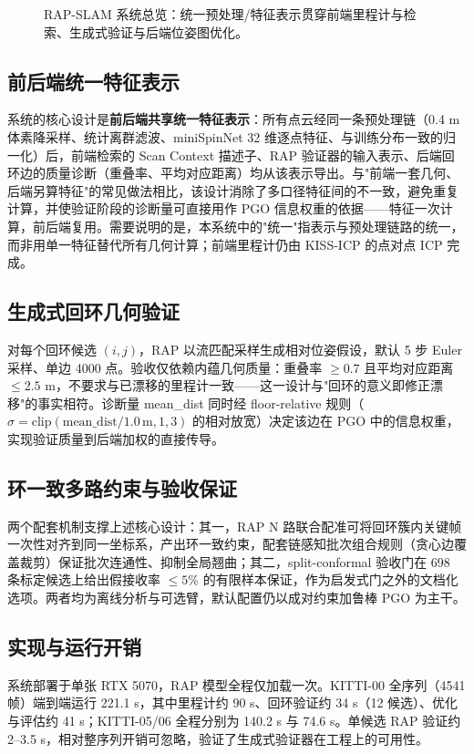 \documentclass[UTF8,12pt]{ctexart}
\begin{document}
\begin{figure}[htbp]
\centering
{}
\caption{RAP-SLAM 系统总览：统一预处理/特征表示贯穿前端里程计与检索、生成式验证与后端位姿图优化。}
\label{fig:pipeline}
\end{figure}

\subsection{前后端统一特征表示}
系统的核心设计是\textbf{前后端共享统一特征表示}：所有点云经同一条预处理链（0.4 m 体素降采样、统计离群滤波、miniSpinNet 32 维逐点特征、与训练分布一致的归一化）后，前端检索的 Scan Context 描述子、RAP 验证器的输入表示、后端回环边的质量诊断（重叠率、平均对应距离）均从该表示导出。与"前端一套几何、后端另算特征"的常见做法相比，该设计消除了多口径特征间的不一致，避免重复计算，并使验证阶段的诊断量可直接用作 PGO 信息权重的依据——特征一次计算，前后端复用。需要说明的是，本系统中的"统一"指表示与预处理链路的统一，而非用单一特征替代所有几何计算；前端里程计仍由 KISS-ICP 的点对点 ICP 完成。

\subsection{生成式回环几何验证}
对每个回环候选 $(i,j)$，RAP 以流匹配采样生成相对位姿假设，默认 5 步 Euler 采样、单边 4000 点。验收仅依赖内蕴几何质量：重叠率 $\ge 0.7$ 且平均对应距离 $\le 2.5$ m，不要求与已漂移的里程计一致——这一设计与"回环的意义即修正漂移"的事实相符。诊断量 mean\_dist 同时经 floor-relative 规则（$\sigma = \mathrm{clip}(\mathrm{mean\_dist}/1.0\,\mathrm{m}, 1, 3)$ 的相对放宽）决定该边在 PGO 中的信息权重，实现验证质量到后端加权的直接传导。

\subsection{环一致多路约束与验收保证}
两个配套机制支撑上述核心设计：其一，RAP N 路联合配准可将回环簇内关键帧一次性对齐到同一坐标系，产出环一致约束，配套链感知批次组合规则（贪心边覆盖裁剪）保证批次连通性、抑制全局翘曲；其二，split-conformal 验收门在 698 条标定候选上给出假接收率 $\le 5\%$ 的有限样本保证，作为启发式门之外的文档化选项。两者均为离线分析与可选臂，默认配置仍以成对约束加鲁棒 PGO 为主干。

\subsection{实现与运行开销}
系统部署于单张 RTX 5070，RAP 模型全程仅加载一次。KITTI-00 全序列（4541 帧）端到端运行 221.1 s，其中里程计约 90 s、回环验证约 34 s（12 候选）、优化与评估约 41 s；KITTI-05/06 全程分别为 140.2 s 与 74.6 s。单候选 RAP 验证约 2--3.5 s，相对整序列开销可忽略，验证了生成式验证器在工程上的可用性。
\end{document}
